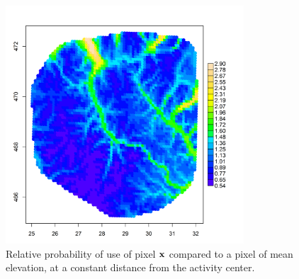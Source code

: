 \documentclass[12pt]{article}
\begin{document}
\begin{figure}
\centering
\includegraphics[width=3.5in,height=3.5in]{figs/spaceusage.png}
\caption{Relative probability of use of pixel ${\bf x}$ compared to a pixel
  of mean elevation, at a constant distance from the activity center.
}
\label{fig.spaceusage}
\end{figure}





\clearpage
\newpage
\end{document}
